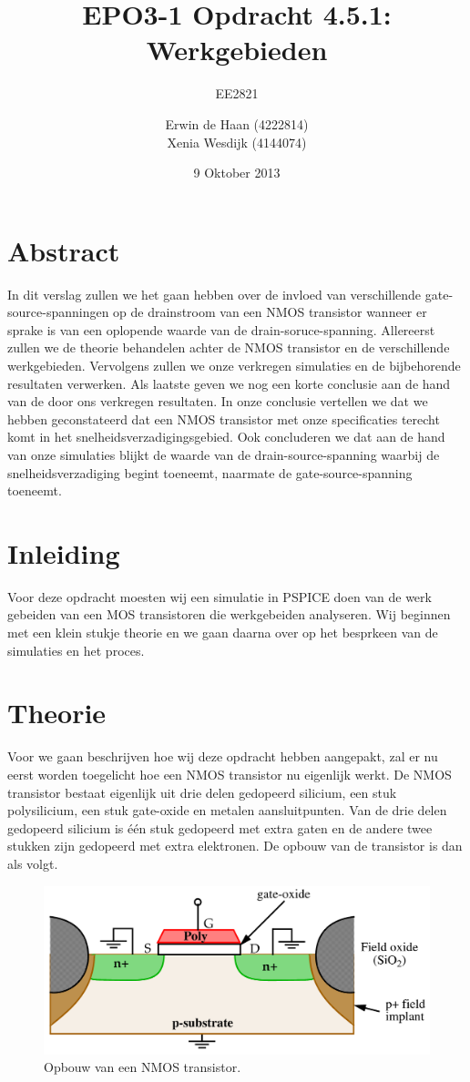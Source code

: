 \documentclass{scrartcl}  %
\author{Erwin {de Haan} (4222814)  \\{Xenia Wesdijk} (4144074)}
\title{EPO3-1   Opdracht 4.5.1: Werkgebieden}
\subtitle{EE2821}
\date{9 Oktober 2013}
\begin{document}
\maketitle
\vspace{80 mm}
\section*{Abstract}
In dit verslag zullen we het gaan hebben over de invloed van verschillende gate-source-spanningen op de drainstroom van een NMOS transistor wanneer er sprake is van een oplopende waarde van de drain-soruce-spanning. 
Allereerst zullen we de theorie behandelen achter de NMOS transistor en de verschillende werkgebieden. 
Vervolgens zullen we onze verkregen simulaties en de bijbehorende resultaten verwerken. 
Als laatste geven we nog een korte conclusie aan de hand van de door ons verkregen resultaten. 
In onze conclusie vertellen we dat we hebben geconstateerd dat een NMOS transistor met onze specificaties terecht komt in het snelheidsverzadigingsgebied. 
Ook concluderen we dat aan de hand van onze simulaties blijkt de waarde van de drain-source-spanning waarbij de snelheidsverzadiging begint toeneemt, naarmate de gate-source-spanning toeneemt.
\newpage
\setlength{\cftbeforetoctitleskip}{-3em}
\tableofcontents
\newpage
{}
\section{Inleiding}
Voor deze opdracht moesten wij een simulatie in PSPICE doen van de werk gebeiden van een MOS transistoren die werkgebeiden analyseren.
Wij beginnen met een klein stukje theorie en we gaan daarna over op het besprkeen van de simulaties en het proces.

\section{Theorie}
Voor we gaan beschrijven hoe wij deze opdracht hebben aangepakt, zal er nu eerst worden toegelicht hoe een NMOS transistor nu eigenlijk werkt. 
De NMOS transistor bestaat eigenlijk uit drie delen gedopeerd silicium, een stuk polysilicium, een stuk gate-oxide en metalen aansluitpunten. 
Van de drie delen gedopeerd silicium is één stuk gedopeerd met extra gaten en de andere twee stukken zijn gedopeerd met extra elektronen. 
De opbouw van de transistor is dan als volgt.
\begin{figure}[H]
\centering
	\includegraphics[width=\textwidth]{resources/MOS-opbouw}
	\caption{Opbouw van een NMOS transistor.\cite{patel-slides}}
	\label{fig:NMOS-transistor}
\end{figure}
\end{document}
